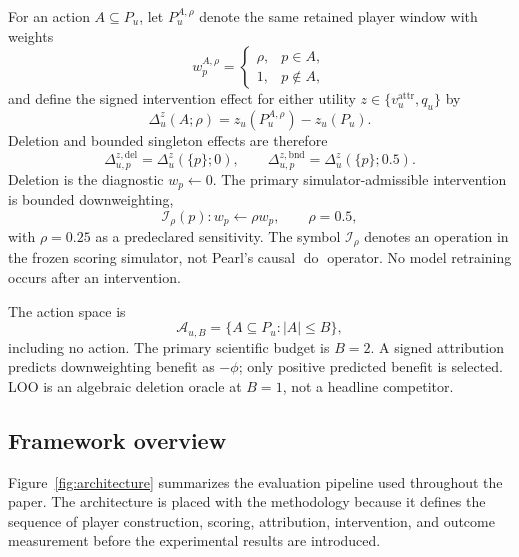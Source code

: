 \documentclass[pdflatex,sn-mathphys-num]{sn-jnl}
\begin{document}
For an action $A\subseteq P_u$, let $P_u^{A,\rho}$ denote the same retained player window with weights
\begin{equation}
w_p^{A,\rho}=\begin{cases}\rho,&p\in A,\\1,&p\notin A,\end{cases}
\end{equation}
and define the signed intervention effect for either utility $z\in\{v_u^{\mathrm{attr}},q_u\}$ by
\begin{equation}
\Delta_u^z(A;\rho)=z_u(P_u^{A,\rho})-z_u(P_u).
\end{equation}
Deletion and bounded singleton effects are therefore
\begin{equation}
\Delta_{u,p}^{z,\mathrm{del}}=\Delta_u^z(\{p\};0),
\qquad
\Delta_{u,p}^{z,\mathrm{bnd}}=\Delta_u^z(\{p\};0.5).
\end{equation}
Deletion is the diagnostic $w_p\leftarrow0$. The primary simulator-admissible intervention is bounded downweighting,
\begin{equation}
\mathcal I_{\rho}(p):w_p\leftarrow\rho w_p,\qquad \rho=0.5,
\end{equation}
with $\rho=0.25$ as a predeclared sensitivity. The symbol $\mathcal I_{\rho}$ denotes an operation in the frozen scoring simulator, not Pearl's causal $\operatorname{do}$ operator. No model retraining occurs after an intervention.

The action space is
\begin{equation}
\mathcal A_{u,B}=\{A\subseteq P_u:|A|\le B\},
\end{equation}
including no action. The primary scientific budget is $B=2$. A signed attribution predicts downweighting benefit as $-\phi$; only positive predicted benefit is selected. LOO is an algebraic deletion oracle at $B=1$, not a headline competitor.

\subsection{Framework overview}
Figure~\ref{fig:architecture} summarizes the evaluation pipeline used throughout the paper. The architecture is placed with the methodology because it defines the sequence of player construction, scoring, attribution, intervention, and outcome measurement before the experimental results are introduced.
\end{document}
